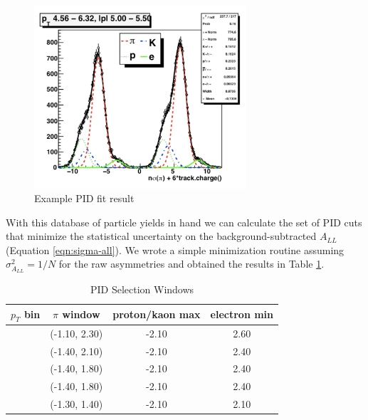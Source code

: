\begin{figure}
  \begin{center}
    \includegraphics[width=0.7\textwidth]{figures/typical-nsigmapi}    
  \end{center}
  \caption{Example PID fit result}
  \label{fig:typical-nsigmapi}
\end{figure}

With this database of particle yields in hand we can calculate the set of PID cuts that minimize the statistical uncertainty on the background-subtracted $A_{LL}$ (Equation \ref{eqn:sigma-all}).  We wrote a simple minimization routine assuming $\sigma_{A_{LL}}^{2} = 1/N$ for the raw asymmetries and obtained the results in Table \ref{tbl:pid-selection-windows}.

\begin{table}
    \begin{center}
        \begin{tabular}{c|ccc}
        \hline
        $p_{T}$ bin & $\pi$ window & proton/kaon max & electron min\\
        \hline
        \hline
        [2.00 - 3.18] & (-1.10, 2.30) & -2.10 & 2.60\\
        \hline
        [3.18 - 4.56] & (-1.40, 2.10) & -2.10 & 2.40\\
        \hline
        [4.56 - 6.32] & (-1.40, 1.80) & -2.10 & 2.40\\
        \hline
        [6.32 - 8.80] & (-1.40, 1.80) & -2.10 & 2.40\\
        \hline
        [8.80 - 12.84] & (-1.30, 1.40) & -2.10 & 2.10\\
    \hline
    \end{tabular}
    \end{center}
    \caption{PID Selection Windows}
    \label{tbl:pid-selection-windows}
\end{table}
